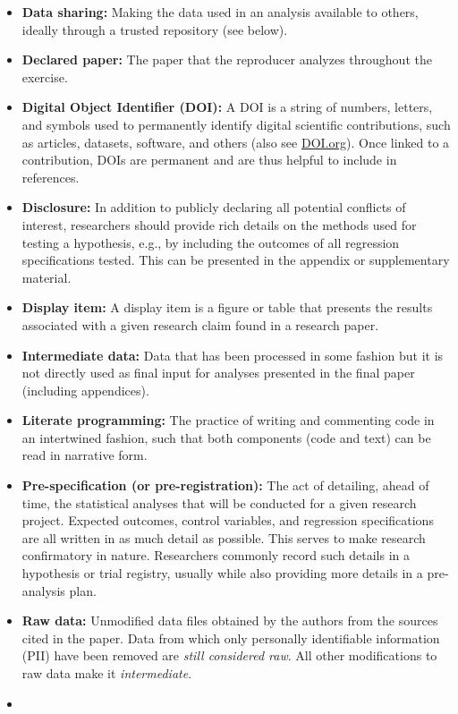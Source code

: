 \documentclass[
  openany]{book}
\begin{document}
\begin{itemize}
\item
  \textbf{Data sharing:} Making the data used in an analysis available to others, ideally through a trusted repository (see below).
\item
  \textbf{Declared paper:} The paper that the reproducer analyzes throughout the exercise.
\item
  \textbf{Digital Object Identifier (DOI):} A DOI is a string of numbers, letters, and symbols used to permanently identify digital scientific contributions, such as articles, datasets, software, and others (also see \href{https://www.doi.org/}{DOI.org}). Once linked to a contribution, DOIs are permanent and are thus helpful to include in references.
\item
  \textbf{Disclosure:} In addition to publicly declaring all potential conflicts of interest, researchers should provide rich details on the methods used for testing a hypothesis, e.g., by including the outcomes of all regression specifications tested. This can be presented in the appendix or supplementary material.
\item
  \textbf{Display item:} A display item is a figure or table that presents the results associated with a given research claim found in a research paper.
\item
  \textbf{Intermediate data:} Data that has been processed in some fashion but it is not directly used as final input for analyses presented in the final paper (including appendices).
\item
  \textbf{Literate programming:} The practice of writing and commenting code in an intertwined fashion, such that both components (code and text) can be read in narrative form.
\item
  \textbf{Pre-specification (or pre-registration):} The act of detailing, ahead of time, the statistical analyses that will be conducted for a given research project. Expected outcomes, control variables, and regression specifications are all written in as much detail as possible. This serves to make research confirmatory in nature.
  Researchers commonly record such details in a hypothesis or trial registry, usually while also providing more details in a pre-analysis plan.
\item
  \textbf{Raw data:} Unmodified data files obtained by the authors from the sources cited in the paper. Data from which only personally identifiable information (PII) have been removed are \emph{still considered raw}. All other modifications to raw data make it \emph{intermediate}.
\item

\end{itemize}
\end{document}
